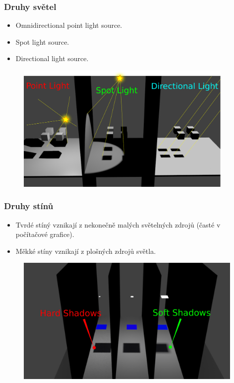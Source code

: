 \begin{frame}
  \frametitle{Druhy světel}
  \begin{itemize}
    \item Omnidirectional point light source.
    \item Spot light source.
    \item Directional light source.
  \end{itemize}
  \begin{figure}[h]
    \includegraphics[width=10.5cm,keepaspectratio]{pics/shadows/lightTypes/lightTypes.pdf}
  \end{figure}
\end{frame}

\begin{frame}
  \frametitle{Druhy stínů}
  \begin{itemize}
    \item Tvrdé stíný vznikají z nekonečně malých světelných zdrojů (časté v počítačové grafice).
    \item Měkké stíny vznikají z plošných zdrojů světla.
  \end{itemize}
  \begin{figure}[h]
    \includegraphics[width=11cm,keepaspectratio]{pics/shadows/hardShadow/hardShadow.pdf}
  \end{figure}
\end{frame}

